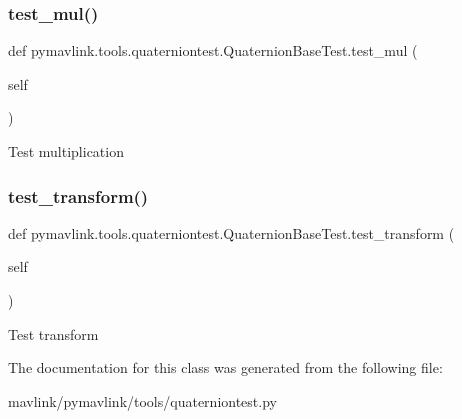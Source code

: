 \subsubsection{\texorpdfstring{test\+\_\+mul()}{test\_mul()}}
{\footnotesize\ttfamily def pymavlink.\+tools.\+quaterniontest.\+Quaternion\+Base\+Test.\+test\+\_\+mul (\begin{DoxyParamCaption}\item[{}]{self }\end{DoxyParamCaption})}

\begin{DoxyVerb}Test multiplication\end{DoxyVerb}
 \mbox{\label{classpymavlink_1_1tools_1_1quaterniontest_1_1QuaternionBaseTest_a834f6d29b7a927b9dc8b0be05c26e9b0}} 
\subsubsection{\texorpdfstring{test\+\_\+transform()}{test\_transform()}}
{\footnotesize\ttfamily def pymavlink.\+tools.\+quaterniontest.\+Quaternion\+Base\+Test.\+test\+\_\+transform (\begin{DoxyParamCaption}\item[{}]{self }\end{DoxyParamCaption})}

\begin{DoxyVerb}Test transform\end{DoxyVerb}
 

The documentation for this class was generated from the following file\+:\begin{DoxyCompactItemize}
\item 
mavlink/pymavlink/tools/quaterniontest.\+py\end{DoxyCompactItemize}
